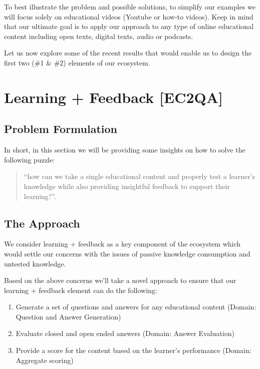 \documentclass[]{book}
\theoremstyle{definition}
\theoremstyle{definition}
\theoremstyle{definition}
\theoremstyle{remark}
\begin{document}
To best illustrate the problem and possible solutions, to simplify our
examples we will focus solely on educational videos (Youtube or how-to
videos). Keep in mind that our ultimate goal is to apply our approach to
any type of online educational content including open texts, digital
texts, audio or podcasts.

Let us now explore some of the recent results that would enable us to
design the first two (\#1 \& \#2) elements of our ecosystem.

\section{Learning + Feedback {[}EC2QA{]}}\label{learning-feedback-ec2qa}

\subsection{Problem Formulation}\label{problem-formulation-1}

In short, in this section we will be providing some insights on how to
solve the following puzzle:

\begin{quote}
``how can we take a single educational content and properly test a
learner's knowledge while also providing insightful feedback to support
their learning?''.
\end{quote}

\subsection{The Approach}\label{the-approach}

We consider learning + feedback as a key component of the ecosystem
which would settle our concerns with the issues of passive knowledge
consumption and untested knowledge.

Based on the above concerns we'll take a novel approach to ensure that
our learning + feedback element can do the following:

\begin{enumerate}
\def\labelenumi{\arabic{enumi}.}
\item
  Generate a set of questions and answers for any educational content
  (Domain: Question and Answer Generation)
\item
  Evaluate closed and open ended answers (Domain: Answer Evaluation)
\item
  Provide a score for the content based on the learner's performance
  (Domain: Aggregate scoring)
\end{enumerate}
\end{document}
